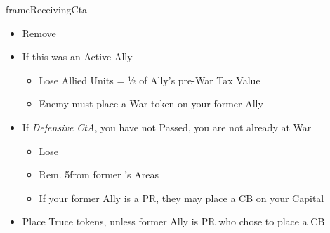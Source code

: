 \documentclass[10pt]{article}
\newlength{\fhDowRestrictions} \setlength\fhDowRestrictions{6\baselineskip}
\newlength{\frameDowRestrictionsY} \setlength\frameDowRestrictionsY{\calc{\textheight - \fhDowRestrictions}}
\newlength{\fhCasusBelli} \setlength\fhCasusBelli{12\baselineskip}
\newlength{\frameCasusBelliY} \setlength\frameCasusBelliY{\calc{\frameDowRestrictionsY - \fhCasusBelli - \frameToFrameSpacing}}
\newlength{\fhHreIntWars} \setlength\fhHreIntWars{4\baselineskip}
\newlength{\frameHreIntWarsY} \setlength\frameHreIntWarsY{\calc{\frameCasusBelliY - \fhHreIntWars - \frameToFrameSpacing}}
\newlength{\fhDefHre} \setlength\fhDefHre{14\baselineskip}
\newlength{\frameDefHreY} \setlength\frameDefHreY{\calc{\frameHreIntWarsY - \fhDefHre - \frameToFrameSpacing}}
\newlength{\fhReceivingCta} \setlength\fhReceivingCta{\calc{\frameDefHreY - \frameToFrameSpacing}}
\begin{document}
\begin{dynamiccontents*}{frameReceivingCta}
\begin{eubox}{\fhReceivingCta}
\begin{multicols}{2}
		\begin{itemize}
			\item Remove \alliance
			\item If this was an Active Ally
			\begin{itemize}
				\item Lose Allied Units = ½ of Ally's pre-War Tax Value
				\item Enemy must place a War token on your former Ally
			\end{itemize}
			\item If \emph{Defensive CtA},  you have not Passed,  you are not already at War
			\begin{itemize}
				\item Lose 
				\item Rem. 5\influence from former \ally's Areas
				\item If your former Ally is a PR, they may place a CB on your Capital
			\end{itemize}
			\item Place Truce tokens, unless former Ally is PR who chose to place a CB
		\end{itemize}
		\vfill
	\end{multicols}
\end{eubox}\end{dynamiccontents*}
\end{document}
